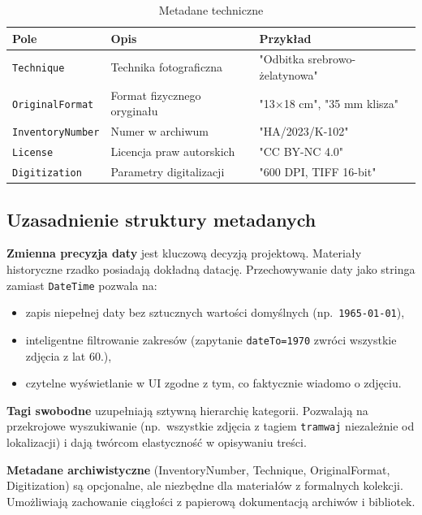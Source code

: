 \documentclass[12pt, a4paper]{article}
\begin{document}
\begin{table}[H]
  \centering
  \caption{Metadane techniczne}
  \begin{tabular}{@{}L{3.8cm}L{5.2cm}L{5cm}@{}}
    \toprule
    \textbf{Pole} & \textbf{Opis} & \textbf{Przykład} \\
    \midrule
    \texttt{Technique}       & Technika fotograficzna      & "Odbitka srebrowo-żelatynowa" \\
    \texttt{OriginalFormat}  & Format fizycznego oryginału & "13$\times$18 cm", "35 mm klisza" \\
    \texttt{InventoryNumber} & Numer w archiwum            & "HA/2023/K-102" \\
    \texttt{License}         & Licencja praw autorskich    & "CC BY-NC 4.0" \\
    \texttt{Digitization}    & Parametry digitalizacji     & "600 DPI, TIFF 16-bit" \\
    \bottomrule
  \end{tabular}
\end{table}

\subsection{Uzasadnienie struktury metadanych}

\textbf{Zmienna precyzja daty} jest kluczową decyzją projektową. Materiały historyczne
rzadko posiadają dokładną datację. Przechowywanie daty jako stringa zamiast \texttt{DateTime}
pozwala na:

\begin{itemize}
  \item zapis niepełnej daty bez sztucznych wartości domyślnych (np.\ \texttt{1965-01-01}),
  \item inteligentne filtrowanie zakresów (zapytanie \texttt{dateTo=1970} zwróci
        wszystkie zdjęcia z lat 60.),
  \item czytelne wyświetlanie w UI zgodne z tym, co faktycznie wiadomo o zdjęciu.
\end{itemize}

\textbf{Tagi swobodne} uzupełniają sztywną hierarchię kategorii. Pozwalają na
przekrojowe wyszukiwanie (np.\ wszystkie zdjęcia z tagiem \texttt{tramwaj} niezależnie
od lokalizacji) i dają twórcom elastyczność w opisywaniu treści.

\textbf{Metadane archiwistyczne} (InventoryNumber, Technique, OriginalFormat, Digitization)
są opcjonalne, ale niezbędne dla materiałów z formalnych kolekcji. Umożliwiają zachowanie
ciągłości z papierową dokumentacją archiwów i bibliotek.
\end{document}
